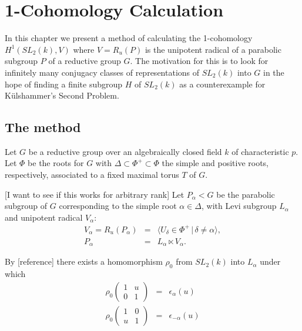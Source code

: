 
\chapter{1-Cohomology Calculation}
\label{Chapter5}

In this chapter we present a method of calculating the 1-cohomology $H^1\left( SL_2(k), V\right)$ where $V=R_u(P)$ is the unipotent radical of a parabolic subgroup $P$ of a reductive group $G$. The motivation for this is to look for infinitely many conjugacy classes of representations of $SL_2(k)$ into $G$ in the hope of finding a finite subgroup $H$ of $SL_2(k)$ as a counterexample for K\"ulshammer's Second Problem.

\section{The method}

Let $G$ be a reductive group over an algebraically closed field $k$ of characteristic $p$. Let $\Phi$ be the roots for $G$ with $\Delta \subset \Phi^+ \subset \Phi$ the simple and positive roots, respectively, associated to a fixed maximal torus $T$ of $G$. 

[I want to see if this works for arbitrary rank] Let $P_\alpha<G$ be the parabolic subgroup of $G$ corresponding to the simple root $\alpha\in\Delta$, with Levi subgroup $L_\alpha$ and unipotent radical $V_\alpha$:
\begin{eqnarray*}
V_\alpha=R_u(P_\alpha) &=& \langle U_\delta \in \Phi^+\, | \, \delta \neq \alpha \rangle,\\
P_\alpha &=& L_\alpha \ltimes V_\alpha.
\end{eqnarray*}

By [reference] there exists a homomorphism $\rho_0$ from $ SL_2(k)$ into $L_\alpha$ under which
\begin{eqnarray*}
\rho_0 \left(\begin{matrix} 1 &  u \\ 0 & 1 \end{matrix} \right) &=& \epsilon_\alpha(u) \\
\rho_0 \left(\begin{matrix} 1 & 0 \\ u & 1 \end{matrix} \right) &=& \epsilon_{-\alpha}(u)
\end{eqnarray*}

